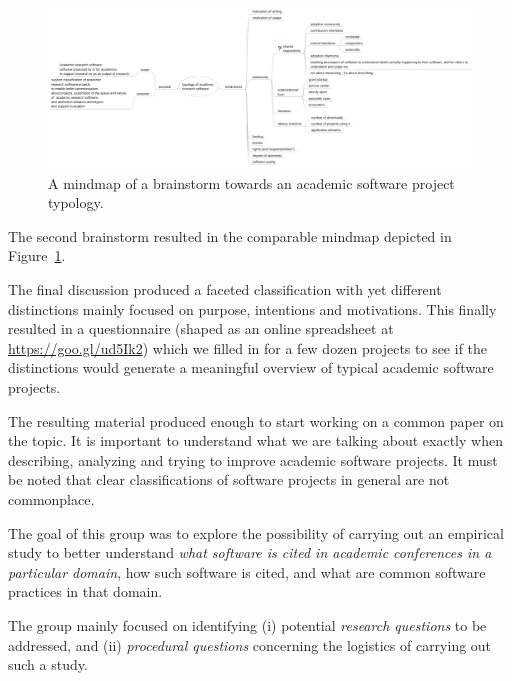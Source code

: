 \documentclass[a4paper,UKenglish]{dagrep}
\begin{document}
\begin{figure}[t]
\includegraphics[width=\textwidth]{ontologymap}
\caption{A mindmap of a brainstorm towards an academic software project typology.\label{fig:ontologymap}}
\end{figure}
The second brainstorm resulted in the comparable mindmap depicted in Figure~\ref{fig:ontologymap}.


The final discussion produced a faceted classification with yet different distinctions mainly focused on purpose, intentions and motivations. This finally resulted in a questionnaire (shaped as an online spreadsheet at \url{https://goo.gl/ud5Ik2}) which we filled in for a few dozen projects to see if the distinctions would generate a meaningful overview of typical academic software projects.

The resulting material produced enough to start working on a common paper on the topic. It is important to understand what we are talking about exactly when describing, analyzing and trying to improve academic software projects. It must be noted that clear classifications of software projects in general are not commonplace.



The goal of this group was to explore the possibility of carrying out an empirical study to better understand \emph{what software is cited in academic conferences in a particular domain}, how such software is cited, and what are common software practices in that domain.

The group mainly focused on identifying (i) potential \emph{research questions} to be addressed, and (ii) \emph{procedural questions} concerning the logistics of carrying out such a study.
\end{document}
